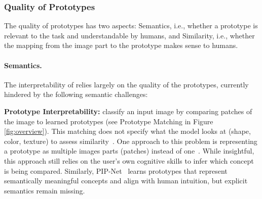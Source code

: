 \subsubsection{\texorpdfstring{\colorbox[RGB]{128, 223, 223}{Quality}}{Quality} of Prototypes}
\label{sssec:chall:proto:quality}
The quality of prototypes has two  aspects: \texorpdfstring{\colorbox[RGB]{191, 239, 239}{Semantics}}{Semantics}, i.e., whether a prototype is relevant to the task and understandable by humans, and \texorpdfstring{\colorbox[RGB]{191, 239, 239}{Similarity}}{Similarity}, i.e., whether the mapping from the image part to the prototype makes sense to humans.

\paragraph{\texorpdfstring{\colorbox[RGB]{191, 239, 239}{Semantics}}{Semantics}.}
\label{ssssec:chall:proto:quality:sem}
The interpretability of \ppms relies largely on the quality of the prototypes, currently hindered by the following semantic challenges:

\textbf{Prototype Interpretability:} 
\ppms classify an input image by comparing patches of the image to learned prototypes (see Prototype Matching in Figure \ref{fig:overview}). This matching does not specify what the model looks at (shape, color, texture) to assess similarity~\citep{Nauta_2021_NeuralPrototypeTrees}.
One approach to this problem is representing a prototype as multiple images parts (patches) instead of one~\citep{Ma_2023_ThisLooksThose}.
While insightful, this approach still relies on the user's own cognitive skills to infer which concept is being compared. Similarly, PIP-Net~\citep{Nauta_2023_PIPNetPatchBasedIntuitive} learns prototypes that represent semantically meaningful concepts and align with human intuition, but explicit semantics remain missing.


